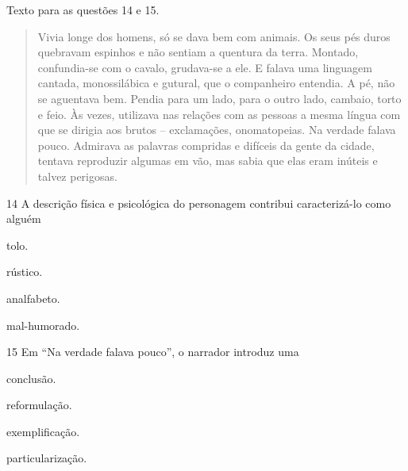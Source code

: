 Texto para as questões 14 e 15.

\begin{quote}
Vivia longe dos homens, só se dava bem com animais. Os seus pés duros
quebravam espinhos e não sentiam a quentura da terra. Montado,
confundia-se com o cavalo, grudava-se a ele. E falava uma linguagem
cantada, monossilábica e gutural, que o companheiro entendia. A pé, não
se aguentava bem. Pendia para um lado, para o outro lado, cambaio, torto
e feio. Às vezes, utilizava nas relações com as pessoas a mesma língua
com que se dirigia aos brutos -- exclamações, onomatopeias. Na verdade
falava pouco. Admirava as palavras compridas e difíceis da gente da
cidade, tentava reproduzir algumas em vão, mas sabia que elas eram
inúteis e talvez perigosas.

\end{quote}

\num{14} A descrição física e psicológica do personagem contribui caracterizá-lo
como alguém

\begin{escolha}
\item tolo.

\item rústico.

\item analfabeto.

\item mal-humorado.
\end{escolha}

\num{15} Em ``Na verdade falava pouco'', o narrador introduz uma

\begin{escolha}
\item conclusão.

\item reformulação.

\item exemplificação.

\item particularização.
\end{escolha}
